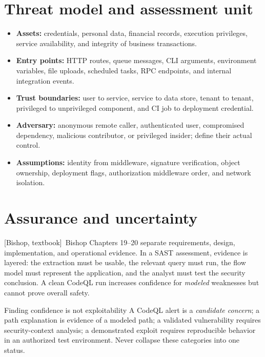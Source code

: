 \documentclass[11pt,letterpaper,oneside]{book}
\newcommand{\srcB}{\textsf{[Bishop, textbook]}}
\begin{document}
\section{Threat model and assessment unit}

\begin{itemize}
\item \textbf{Assets:} credentials, personal data, financial records, execution privileges, service availability, and integrity of business transactions.
\item \textbf{Entry points:} HTTP routes, queue messages, CLI arguments, environment variables, file uploads, scheduled tasks, RPC endpoints, and internal integration events.
\item \textbf{Trust boundaries:} user to service, service to data store, tenant to tenant, privileged to unprivileged component, and CI job to deployment credential.
\item \textbf{Adversary:} anonymous remote caller, authenticated user, compromised dependency, malicious contributor, or privileged insider; define their actual control.
\item \textbf{Assumptions:} identity from middleware, signature verification, object ownership, deployment flags, authorization middleware order, and network isolation.
\end{itemize}

\section{Assurance and uncertainty}

\srcB\ Bishop Chapters 19--20 separate requirements, design, implementation, and operational evidence. In a SAST assessment, evidence is layered: the extraction must be usable, the relevant query must run, the flow model must represent the application, and the analyst must test the security conclusion. A clean CodeQL run increases confidence for \emph{modeled} weaknesses but cannot prove overall safety.

\begin{infobox}{Finding confidence is not exploitability}
A CodeQL alert is a \emph{candidate concern}; a path explanation is evidence of a modeled path; a validated vulnerability requires security-context analysis; a demonstrated exploit requires reproducible behavior in an authorized test environment. Never collapse these categories into one status.
\end{infobox}
\end{document}

